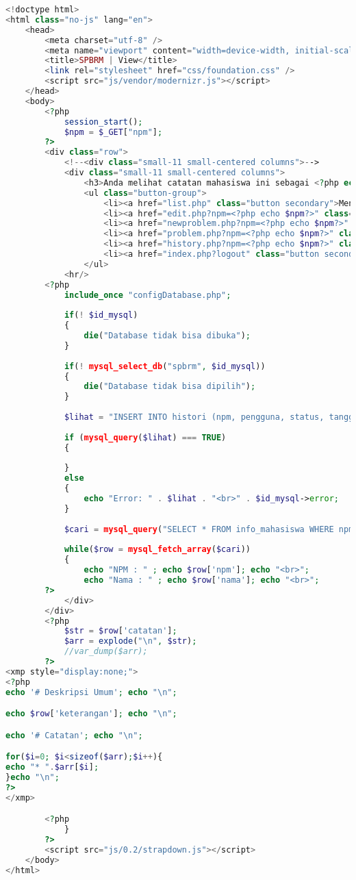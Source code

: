 \begin{lstlisting}[language=php,basicstyle=\tiny,caption=view.php]
<!doctype html>
<html class="no-js" lang="en">
	<head>
		<meta charset="utf-8" />
		<meta name="viewport" content="width=device-width, initial-scale=1.0" />
		<title>SPBRM | View</title>
		<link rel="stylesheet" href="css/foundation.css" />
		<script src="js/vendor/modernizr.js"></script>
	</head>
	<body>
		<?php
			session_start();
			$npm = $_GET["npm"];
		?>
		<div class="row">
			<!--<div class="small-11 small-centered columns">-->
			<div class="small-11 small-centered columns">
				<h3>Anda melihat catatan mahasiswa ini sebagai <?php echo $_SESSION['email']?>.</h3>
				<ul class="button-group">
					<li><a href="list.php" class="button secondary">Menu Utama</a></li>
					<li><a href="edit.php?npm=<?php echo $npm?>" class="button secondary">Edit</a></li>
					<li><a href="newproblem.php?npm=<?php echo $npm?>" class="button secondary">Masalah Baru</a></li>
					<li><a href="problem.php?npm=<?php echo $npm?>" class="button secondary">Lihat Masalah</a></li>
					<li><a href="history.php?npm=<?php echo $npm?>" class="button secondary">Lihat Histori</a></li>
					<li><a href="index.php?logout" class="button secondary">Logout</a></li>
				</ul>
			<hr/>
		<?php
			include_once "configDatabase.php";
			
			if(! $id_mysql)
			{
				die("Database tidak bisa dibuka");
			}
				
			if(! mysql_select_db("spbrm", $id_mysql))
			{
				die("Database tidak bisa dipilih");
			}
			
			$lihat = "INSERT INTO histori (npm, pengguna, status, tanggal_pembaruan, keterangan) VALUES ('". mysql_real_escape_string($npm)  ."', '".$_SESSION['email']."', 'melihat', now(), '')";
			
			if (mysql_query($lihat) === TRUE) 
			{
				
			}
			else
			{
				echo "Error: " . $lihat . "<br>" . $id_mysql->error;
			}
			
			$cari = mysql_query("SELECT * FROM info_mahasiswa WHERE npm='$npm'", $id_mysql);
			
			while($row = mysql_fetch_array($cari))
			{
				echo "NPM : " ; echo $row['npm']; echo "<br>";
				echo "Nama : " ; echo $row['nama']; echo "<br>";
		?>
			</div>
		</div>
		<?php
			$str = $row['catatan'];
			$arr = explode("\n", $str);
			//var_dump($arr);
		?>
<xmp style="display:none;">
<?php
echo '# Deskripsi Umum'; echo "\n";

echo $row['keterangan']; echo "\n";

echo '# Catatan'; echo "\n";

for($i=0; $i<sizeof($arr);$i++){
echo "* ".$arr[$i]; 
}echo "\n";
?>
</xmp>

		<?php
			}
		?>
		<script src="js/0.2/strapdown.js"></script>
	</body>
</html>
\end{lstlisting}

